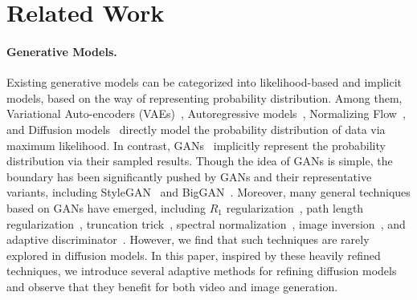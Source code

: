 \documentclass[letterpaper]{article}
\begin{document}
\section{Related Work}
\paragraph{Generative Models.}
Existing generative models can be categorized into likelihood-based and implicit models, based on the way of representing probability distribution.
Among them, Variational Auto-encoders (VAEs)~\cite{kingma2013auto}, Autoregressive models~\cite{van2016pixel, germain2015made}, Normalizing Flow~\cite{dinh2016density}, and Diffusion models~\cite{sohl2015deep, ho2020denoising} directly model the probability distribution of data via maximum likelihood.
In contrast, GANs~\cite{goodfellow2014generative} implicitly represent the probability distribution via their sampled results.
Though the idea of GANs is simple, the boundary has been significantly pushed by GANs and their representative variants, including StyleGAN~\cite{karras2019style, karras2020analyzing, karras2020training} and BigGAN~\cite{brock2018large}.
Moreover, many general techniques based on GANs have emerged, including $R_1$ regularization~\cite{mescheder2018training}, path length regularization~\cite{karras2020analyzing}, truncation trick~\cite{karras2019style}, spectral normalization~\cite{miyato2018spectral}, image inversion~\cite{mei2021ltt}, and adaptive discriminator~\cite{karras2020training}.
However, we find that such techniques are rarely explored in diffusion models.
In this paper, inspired by these heavily refined techniques, we introduce several adaptive methods for refining diffusion models and observe that they benefit for both video and image generation.
\end{document}
